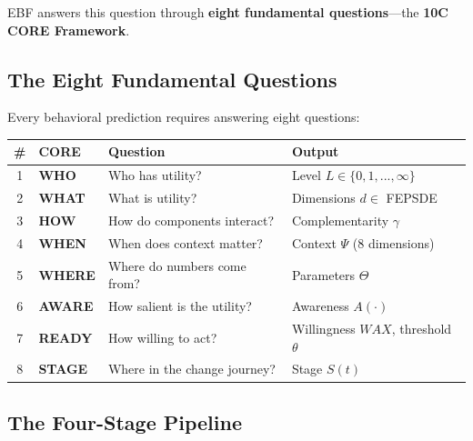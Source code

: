 EBF answers this question through \textbf{eight fundamental questions}---the
\textbf{10C CORE Framework}.

\subsection{The Eight Fundamental Questions}

\begin{definition}
\label{def:10c-core}
Every behavioral prediction requires answering eight questions:

\begin{center}
\renewcommand{\arraystretch}{1.4}
\begin{tabular}{@{}clll@{}}
\toprule
\textbf{\#} & \textbf{CORE} & \textbf{Question} & \textbf{Output} \\
\midrule
1 & \textbf{WHO} & Who has utility? & Level $L \in \{0, 1, ..., \infty\}$ \\
2 & \textbf{WHAT} & What is utility? & Dimensions $d \in$ FEPSDE \\
3 & \textbf{HOW} & How do components interact? & Complementarity $\gamma$ \\
4 & \textbf{WHEN} & When does context matter? & Context $\Psi$ (8 dimensions) \\
5 & \textbf{WHERE} & Where do numbers come from? & Parameters $\Theta$ \\
6 & \textbf{AWARE} & How salient is the utility? & Awareness $A(\cdot)$ \\
7 & \textbf{READY} & How willing to act? & Willingness $WAX$, threshold $\theta$ \\
8 & \textbf{STAGE} & Where in the change journey? & Stage $S(t)$ \\
\bottomrule
\end{tabular}
\end{center}
\end{definition}

\subsection{The Four-Stage Pipeline}
\label{sec:10c-pipeline}

